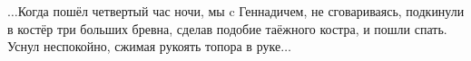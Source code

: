 %

%

\begin{center}
\end{center}

$\ldots$Когда пошёл четвертый час ночи, мы c Геннадичем, не сговариваясь, подкинули в костёр три больших бревна, сделав подобие таёжного костра, и пошли спать. Уснул неспокойно, сжимая рукоять топора в руке$\ldots$ 

\begin{center}
\end{center}
